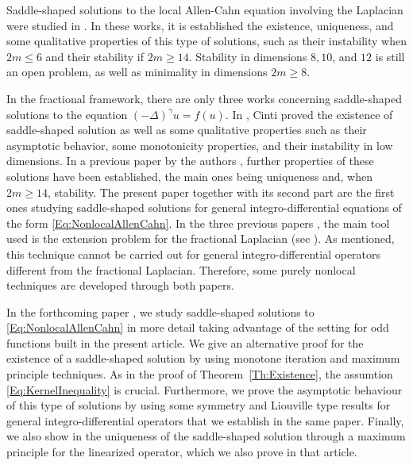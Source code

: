 \documentclass[12pt,reqno]{amsart}
\theoremstyle{definition}
\theoremstyle{remark}
\newcommand{\s}{\gamma}
\newcommand{\fraclaplacian}{(-\Delta)^\s}
\numberwithin{equation}{section}
\begin{document}
Saddle-shaped solutions to the local Allen-Cahn equation involving the Laplacian were studied in \cite{DangFifePeletier, Schatzman, CabreTerraI,CabreTerraII, Cabre-Saddle}. In these works, it is established the existence, uniqueness, and some qualitative properties of this type of solutions, such as their instability when $2m\leq 6$ and their stability if $2m\geq 14$. Stability in dimensions $8, 10$, and $12$ is still an open problem, as well as minimality in dimensions $2m\geq 8$.

In the fractional framework, there are only three works concerning saddle-shaped solutions to the equation $\fraclaplacian u = f(u)$. In \cite{Cinti-Saddle,Cinti-Saddle2}, Cinti proved the existence of saddle-shaped solution as well as some qualitative properties such as their asymptotic behavior, some monotonicity properties, and their instability in low dimensions. In a previous paper by the authors \cite{Felipe-Sanz-Perela:SaddleFractional}, further properties of these solutions have been established, the main ones being uniqueness and, when $2m\geq 14$, stability. The present paper together with its second part \cite{FelipeSanz-Perela:IntegroDifferentialII} are the first ones studying saddle-shaped solutions for general integro-differential equations of the form \eqref{Eq:NonlocalAllenCahn}. In the three previous papers \cite{Cinti-Saddle, Cinti-Saddle2, Felipe-Sanz-Perela:SaddleFractional}, the main tool used is the extension problem for the fractional Laplacian (see \cite{CaffarelliSilvestre}). As mentioned, this technique cannot be carried out for general integro-differential operators different from the fractional Laplacian. Therefore, some purely nonlocal techniques are developed through both papers.

In the forthcoming paper \cite{FelipeSanz-Perela:IntegroDifferentialII}, we study saddle-shaped solutions to \eqref{Eq:NonlocalAllenCahn} in more detail taking advantage of the setting for odd functions built in the present article. We give an alternative proof for the existence of a saddle-shaped solution by using monotone iteration and maximum principle techniques. As in the proof of Theorem~\ref{Th:Existence}, the assumtion \eqref{Eq:KernelInequality} is crucial. Furthermore, we prove the asymptotic behaviour of this type of solutions by using some symmetry and Liouville type results for general integro-differential operators that we establish in the same paper. Finally, we also show in \cite{FelipeSanz-Perela:IntegroDifferentialII} the uniqueness of the saddle-shaped solution through a maximum principle for the linearized operator, which we also prove in that article.
\end{document}
